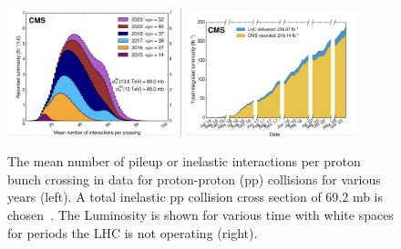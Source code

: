 \begin{figure}[tbp!]
\begin{center}
\includegraphics[angle=0,width=0.45\textwidth]{fig/PileupAcrossTheYears.png}
\includegraphics[angle=0,width=0.45\textwidth]{fig/LuminosityAcrossTheYears.png}
\end{center}
\caption{The mean number of pileup or inelastic interactions per proton bunch crossing in data
for proton-proton (pp) collisions for various years (left). A total inelastic pp collision
cross section of 69.2 mb is chosen~\cite{CMS:2020ebo}. The Luminosity is shown for various time with white spaces for periods the LHC is not operating (right).}
\label{fig:LHCBeam}
\end{figure}






%
%





